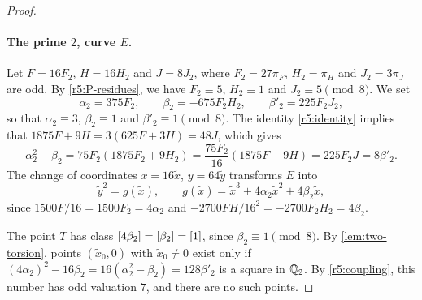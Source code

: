 \begin{proof}
\paragraph{The prime $2$, curve $E$.} Let $F=16F_2$, $H=16H_2$ and $J=8J_2$, where $F_2=27\pi_F$, $H_2=\pi_H$ and $J_2=3\pi_J$ are odd. By \eqref{r5:P-residues}, we have $F_2\equiv5$, $H_2\equiv1$ and $J_2\equiv5\pmod8$. We set
\[
\alpha_2=375F_2,\qquad\beta_2=-675F_2H_2,\qquad\beta'_2=225F_2J_2,
\]
so that $\alpha_2\equiv3$, $\beta_2\equiv1$ and $\beta'_2\equiv1\pmod8$. The identity \eqref{r5:identity} implies that $1875F+9H=3(625F+3H)=48J$, which gives
\begin{equation}\label{r5:coupling}
\alpha_2^2-\beta_2=75F_2(1875F_2+9H_2)=\frac{75F_2}{16}(1875F+9H)=225F_2J=8\beta'_2.
\end{equation}
The change of coordinates $x=16\tilde x$, $y=64\tilde y$ transforms $E$ into
\[
\tilde y^2=g(\tilde x),\qquad g(\tilde x)=\tilde x^3+4\alpha_2 \tilde x^2+4\beta_2 \tilde x,
\]
since $1500F/16=1500F_2=4\alpha_2$ and $-2700FH/16^2=-2700F_2H_2=4\beta_2$.

The point $T$ has class $[4\beta_2]=[\beta_2]=[1]$, since $\beta_2\equiv1\pmod8$. By \cref{lem:two-torsion}, points $(\tilde x_0,0)$ with $\tilde x_0\ne0$ exist only if $(4\alpha_2)^2-16\beta_2=16(\alpha_2^2-\beta_2)=128\beta'_2$ is a square in $\mathbb Q_2$. By \eqref{r5:coupling}, this number has odd valuation $7$, and there are no such points.


\end{proof}
